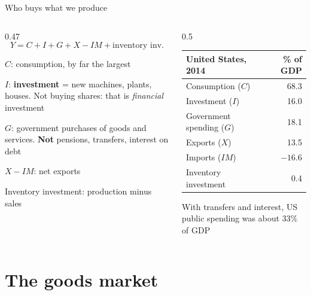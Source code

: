 \documentclass[aspectratio=169,xcolor=table]{beamer}
\begin{document}
\begin{frame}{Who buys what we produce}
\begin{columns}[T]
\begin{column}{0.47\textwidth}
\footnotesize
\[
Y = C + I + G + X - IM + \text{inventory inv.}
\]
\bi
  \item $C$: consumption, by far the largest
  \item $I$: \textbf{investment} = new machines, plants, houses. Not buying shares: that is \emph{financial} investment
  \item $G$: government purchases of goods and services. \textbf{Not} pensions, transfers, interest on debt
  \item $X - IM$: net exports
  \item Inventory investment: production minus sales
\ei
\end{column}
\begin{column}{0.5\textwidth}
\centering\footnotesize
\begin{tabular}{lr}
\toprule
\textbf{United States, 2014} & \textbf{\% of GDP}\\
\midrule
Consumption ($C$) & 68.3 \\
Investment ($I$) & 16.0 \\
Government spending ($G$) & 18.1 \\
Exports ($X$) & 13.5 \\
Imports ($IM$) & $-16.6$ \\
Inventory investment & 0.4 \\
\bottomrule
\end{tabular}
\vspace{0.1cm}
\raggedright\small
\footnotesize With transfers and interest, US public spending was about 33\% of GDP
\end{column}
\end{columns}
\end{frame}

\section{The goods market}
\end{document}
